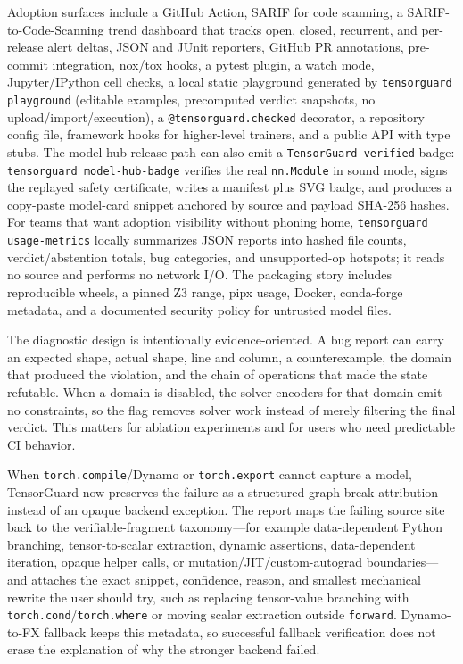 \documentclass[11pt]{article}
\newcommand{\tg}{TensorGuard}
\begin{document}
Adoption surfaces include a GitHub Action, SARIF for code scanning, a
SARIF-to-Code-Scanning trend dashboard that tracks open, closed, recurrent, and
per-release alert deltas, JSON and JUnit reporters, GitHub PR annotations,
pre-commit integration, nox/tox hooks, a pytest plugin, a watch mode,
Jupyter/IPython cell checks, a local static playground generated by
\texttt{tensorguard playground} (editable examples, precomputed verdict
snapshots, no upload/import/execution), a
\texttt{@tensorguard.checked} decorator, a repository config file, framework
hooks for higher-level trainers, and a public API with type stubs.  The
model-hub release path can also emit a \texttt{TensorGuard-verified} badge:
\texttt{tensorguard model-hub-badge} verifies the real \texttt{nn.Module} in
sound mode, signs the replayed safety certificate, writes a manifest plus SVG badge,
and produces a copy-paste model-card snippet anchored by source and payload
SHA-256 hashes.  For teams that want adoption visibility without phoning home,
\texttt{tensorguard usage-metrics} locally summarizes JSON reports into hashed
file counts, verdict/abstention totals, bug categories, and unsupported-op
hotspots; it reads no source and performs no network I/O.  The
packaging story includes reproducible wheels, a pinned Z3 range, pipx usage,
Docker, conda-forge metadata, and a documented security policy for untrusted
model files.

The diagnostic design is intentionally evidence-oriented.  A bug report can
carry an expected shape, actual shape, line and column, a counterexample, the
domain that produced the violation, and the chain of operations that made the
state refutable.  When a domain is disabled, the solver encoders for that
domain emit no constraints, so the flag removes solver work instead of merely
filtering the final verdict.  This matters for ablation experiments and for
users who need predictable CI behavior.

When \texttt{torch.compile}/Dynamo or \texttt{torch.export} cannot capture a
model, \tg{} now preserves the failure as a structured graph-break attribution
instead of an opaque backend exception.  The report maps the failing source site
back to the verifiable-fragment taxonomy---for example data-dependent Python
branching, tensor-to-scalar extraction, dynamic assertions, data-dependent
iteration, opaque helper calls, or mutation/JIT/custom-autograd boundaries---and
attaches the exact snippet, confidence, reason, and smallest mechanical rewrite
the user should try, such as replacing tensor-value branching with
\texttt{torch.cond}/\texttt{torch.where} or moving scalar extraction outside
\texttt{forward}.  Dynamo-to-FX fallback keeps this metadata, so successful
fallback verification does not erase the explanation of why the stronger backend
failed.
\end{document}
